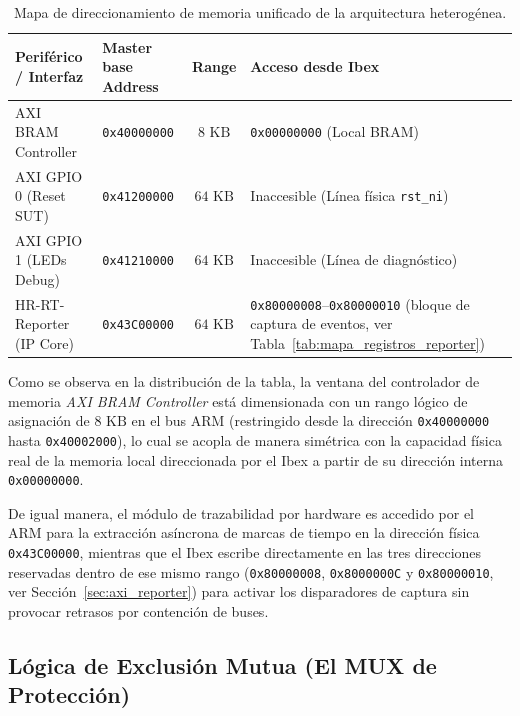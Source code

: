 \begin{table}[htbp]
\centering
\caption{Mapa de direccionamiento de memoria unificado de la arquitectura heterogénea.}
\label{tab:mapa_memoria}
\begin{tabular}{llcl}
\hline
\textbf{Periférico / Interfaz} & \textbf{Master base Address}	& \textbf{Range}	& \textbf{Acceso desde Ibex}				\\ \hline
AXI BRAM Controller            & \texttt{0x40000000}		& $8\text{ KB}$		& \texttt{0x00000000} (Local BRAM)		\\
AXI GPIO 0 (Reset SUT)         & \texttt{0x41200000}		& $64\text{ KB}$	& Inaccesible (Línea física \texttt{rst\_ni})	\\
AXI GPIO 1 (LEDs Debug)        & \texttt{0x41210000}		& $64\text{ KB}$	& Inaccesible (Línea de diagnóstico)            \\
HR-RT-Reporter (IP Core)       & \texttt{0x43C00000}		& $64\text{ KB}$	& \texttt{0x80000008}--\texttt{0x80000010} (bloque de captura de eventos, ver Tabla~\ref{tab:mapa_registros_reporter})         \\ \hline
\end{tabular}
\end{table}

Como se observa en la distribución de la tabla, la ventana del controlador de memoria \textit{AXI BRAM Controller} está dimensionada con un rango lógico de asignación de $8\text{ KB}$ en el bus ARM (restringido desde la dirección \texttt{0x40000000} hasta \texttt{0x40002000}), lo cual se acopla de manera simétrica con la capacidad física real de la memoria local direccionada por el Ibex a partir de su dirección interna \texttt{0x00000000}.

De igual manera, el módulo de trazabilidad por hardware es accedido
    por el ARM para la extracción asíncrona de marcas de tiempo en la
    dirección física \texttt{0x43C00000}, mientras que el Ibex escribe
    directamente en las tres direcciones reservadas dentro de ese mismo
    rango (\texttt{0x80000008}, \texttt{0x8000000C} y \texttt{0x80000010},
    ver Sección~\ref{sec:axi_reporter}) para activar los disparadores de
    captura sin provocar retrasos por contención de buses.

\subsection{Lógica de Exclusión Mutua (El MUX de Protección)}
\label{ssec:exclusion_mutua}

